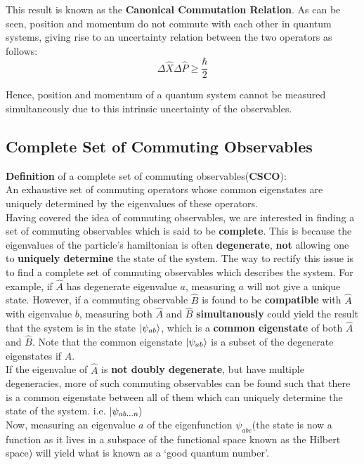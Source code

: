 \documentclass{article}
\begin{document}
\begin{flushleft}
This result is known as the  \textbf{Canonical Commutation Relation}. As can be seen, position and momentum do not commute with each other in quantum systems, giving rise to an uncertainty relation between the two operators as follows:
$$\Delta\hat{X}\Delta\hat{P}\geq\frac{\hbar}{2}$$

Hence, position and momentum of a quantum system cannot be measured simultaneously due to this intrinsic uncertainty of the observables.\\[0.5cm]

\subsection{Complete Set of Commuting Observables}

\textbf{Definition} of a complete set of commuting observables(\textbf{CSCO}):\\
An exhaustive set of commuting operators whose common eigenstates are uniquely determined by the eigenvalues of these operators.\\[0.5cm]

Having covered the idea of commuting observables, we are interested in finding a set of commuting observables which is said to be \textbf{complete}. This is because the eigenvalues of the particle's hamiltonian is often \textbf{degenerate}, \textbf{not} allowing one to \textbf{uniquely determine} the state of the system. The way to rectify this issue is to find a complete set of commuting observables which describes the system. For example, if $\hat{A}$ has degenerate eigenvalue $a$, measuring $a$ will not give a unique state. However, if a commuting observable $\hat{B}$ is found to be \textbf{compatible} with $\hat{A}$ with eigenvalue $b$, measuring both $\hat{A}$ and $\hat{B}$ \textbf{simultanously} could yield the result that the system is in the state $\ket{\psi_{ab}}$, which is a \textbf{common eigenstate} of both $\hat{A}$ and $\hat{B}$. Note that the common eigenstate $\ket{\psi_{ab}}$ is a subset of the degenerate eigenstates if $\hat{A}$.\\[0.5cm]

If the eigenvalue of $\hat{A}$ is \textbf{not doubly degenerate}, but have multiple degeneracies, more of such commuting observables can be found such that there is a common eigenstate between all of them which can uniquely determine the state of the system. i.e. $\ket{\psi_{ab...n}}$\\[0.5cm]

Now, measuring an eigenvalue $a$ of the eigenfunction $\psi_{abc}$(the state is now a function as it lives in a subspace of the functional space known as the Hilbert space) will yield what is known as a `good quantum number'.\\[0.5cm]


\end{flushleft}
\end{document}
